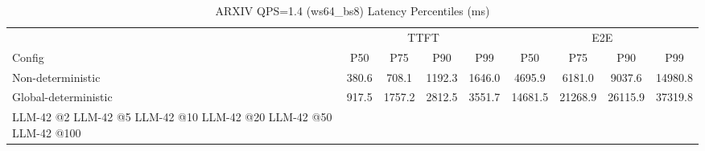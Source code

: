 \begin{table}[htbp]
\centering
\caption{ARXIV QPS=1.4 (ws64_bs8) Latency Percentiles (ms)}
\label{tab:arxiv_qps1.4_ws64_bs8}
\begin{tabular}{l|cccc|cccc}
\toprule
& \multicolumn{4}{c|}{TTFT} & \multicolumn{4}{c}{E2E} \\
Config & P50 & P75 & P90 & P99 & P50 & P75 & P90 & P99 \\
\midrule
Non-deterministic & 380.6 & 708.1 & 1192.3 & 1646.0 & 4695.9 & 6181.0 & 9037.6 & 14980.8 \\
Global-deterministic & 917.5 & 1757.2 & 2812.5 & 3551.7 & 14681.5 & 21268.9 & 26115.9 & 37319.8 \\
LLM-42 @2%
LLM-42 @5%
LLM-42 @10%
LLM-42 @20%
LLM-42 @50%
LLM-42 @100%
\bottomrule
\end{tabular}
\end{table}
